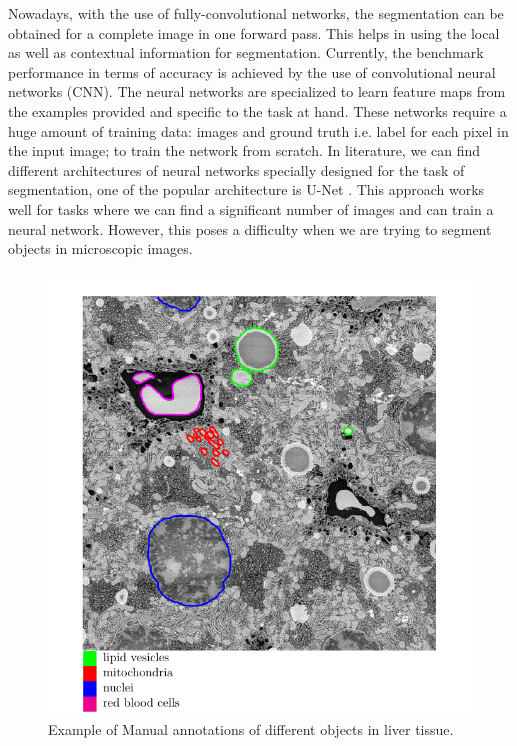  Nowadays, with the use of fully-convolutional networks, the segmentation can be obtained for a complete image in one forward pass. This helps in using the local as well as contextual information for segmentation. Currently, the benchmark performance in terms of accuracy is achieved by the use of convolutional neural networks (CNN). The neural networks are specialized to learn feature maps from the examples provided and specific to the task at hand. These networks require a huge amount of training data: images and ground truth i.e. label for each pixel in the input image; to train the network from scratch. In literature, we can find different architectures of neural networks specially designed for the task of segmentation, one of the popular architecture is U-Net \cite{unet}. This approach works well for tasks where we can find a significant number of images and can train a neural network. However, this poses a difficulty when we are trying to segment objects in microscopic images.


\begin{figure}[h!] \label{fig:3dstack}
\centering
 \includegraphics[width=0.8\linewidth]{figures/vesicles.png}
\caption{Example of Manual annotations of different objects in liver tissue.}
\end{figure}


